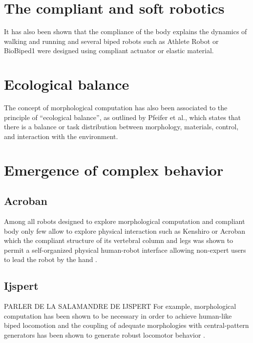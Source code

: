 \section{The compliant and soft robotics} %
It has also been shown that the compliance of the body explains the dynamics of walking and running \cite{Geyer2006} and several biped robots such as Athlete Robot \cite{niiyama2010athlete} or BioBiped1 \cite{radkhah2011concept} were designed using compliant actuator or elastic material.

\section{Ecological balance}

The concept of morphological computation has also been associated to the principle of “ecological balance”, as outlined by Pfeifer et al.\cite{pfeifer2005new}, which states that there is a balance or task distribution between morphology, materials, control, and interaction with the environment.

\section{Emergence of complex behavior} %

\subsection{Acroban} %
\label{sub:acroban}
Among all robots designed to explore morphological computation and compliant body only few allow to explore physical interaction such as Kenshiro \cite{Asano2012} or Acroban which the compliant structure of its vertebral column and legs was shown to permit a self-organized physical human-robot interface allowing non-expert users to lead the robot by the hand \cite{Ly2011bio}\cite{Oudeyer2011}.

\subsection{Ijspert} %
\label{sub:ijspert}

PARLER DE LA SALAMANDRE DE IJSPERT
For example, morphological computation has been shown to be necessary in order to achieve human-like biped locomotion \cite{matsushita2005locomoting} and the coupling of adequate morphologies with central-pattern generators has been shown to generate robust locomotor behavior \cite{ijspeert2007swimming}\cite{steingrube2010self}.



